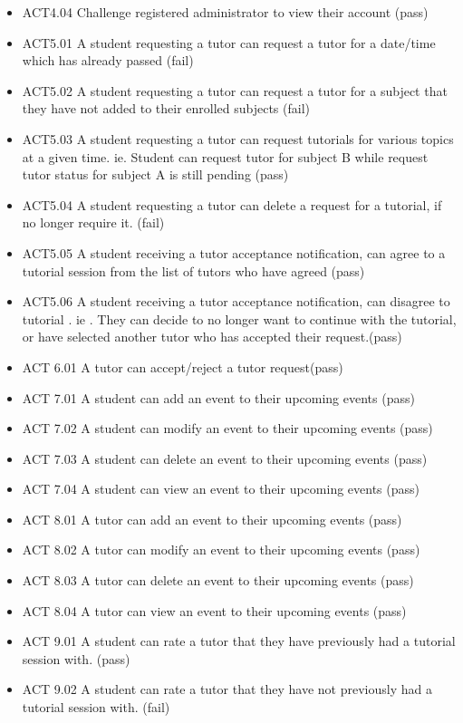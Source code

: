 \documentclass[12pt]{article}
\begin{document}
\begin{itemize}
\item ACT4.04	Challenge registered administrator to view their account (pass)
\item ACT5.01	A student requesting a tutor can request a tutor for a date/time which has already passed  (fail)	
\item ACT5.02	A student requesting a tutor can request a tutor for a subject that they have not added to their enrolled subjects  (fail)
\item ACT5.03	A student requesting a tutor can request tutorials for various topics at a given time. ie. Student can request tutor for subject B while request tutor status for subject A is still pending (pass)	
\item ACT5.04	A student requesting a tutor can delete a request for a  tutorial, if no longer require it. (fail)
\item ACT5.05	A student receiving a tutor acceptance notification, can agree to a tutorial session from the list  of tutors who have agreed (pass)
\item ACT5.06 A student receiving a tutor acceptance notification, can disagree to tutorial . ie . They can decide to no longer want to continue with the tutorial, or have selected another tutor who has accepted their request.(pass)		%
\item ACT 6.01 A tutor can accept/reject a tutor request(pass)
\item ACT 7.01 A student can add an event to their upcoming events (pass)	
\item ACT 7.02 A student can modify an event to their upcoming events (pass)
\item ACT 7.03 A student can delete an event to their upcoming events (pass)
\item ACT 7.04 A student can view an event to their upcoming events (pass)
\item ACT 8.01 A tutor can add an event to their upcoming events (pass)	
\item ACT 8.02 A tutor can modify an event to their upcoming events (pass)
\item ACT 8.03 A tutor can delete an event to their upcoming events (pass)
\item ACT 8.04 A tutor can view an event to their upcoming events (pass)
\item ACT 9.01 A student can rate a tutor that they have previously had a tutorial session with. (pass)
\item ACT 9.02 A student can rate a tutor that they have not previously had a tutorial session with. (fail)

\end{itemize}
\end{document}
